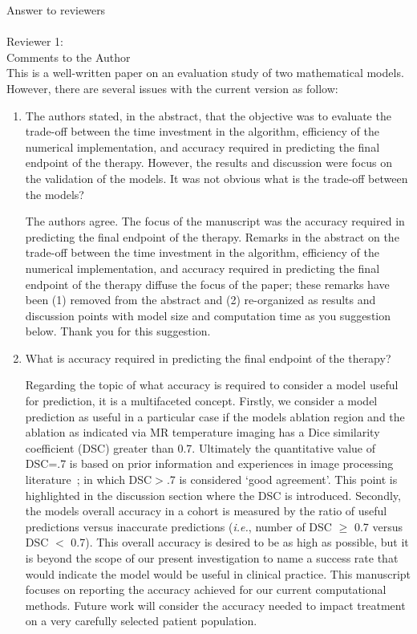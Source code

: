 \documentclass[letterpaper,12pt]{report}
\begin{document}
Answer to reviewers\\
\\
Reviewer 1:\\
Comments to the Author\\
This is a well-written paper on an evaluation study of
two mathematical models. However, there are several issues with the current version as follow:\\

\begin{enumerate}
\item
The authors stated, in the abstract, that the objective
was to evaluate the trade-off between the
time investment in the algorithm, efficiency of the numerical
implementation, and accuracy required in
predicting the final endpoint of the therapy. However,
the results and discussion were focus on the validation
of the models. It was not obvious what is the trade-off
between the models? 

{\color{red}
The authors agree. The focus of the manuscript was
the accuracy required in
predicting the final endpoint of the therapy. 
Remarks in the abstract on the trade-off between the
time investment in the algorithm, efficiency of the numerical
implementation, and accuracy required in
predicting the final endpoint of the therapy diffuse the focus
of the paper; these remarks have been (1) removed from the abstract and (2)
re-organized as results and  discussion points with model size and
computation time as you suggestion below.  Thank you for this suggestion.
}


\item What is accuracy required in predicting the final endpoint of the therapy?
 
{\color{red}

Regarding the topic of what accuracy is required to consider a model useful
for prediction, it is a multifaceted concept. Firstly, we consider a model
prediction as useful in a particular case if the models ablation region and
the ablation as indicated via MR temperature imaging has a Dice similarity
coefficient (DSC) greater than 0.7. Ultimately the quantitative value of
DSC=.7 is based on prior information and experiences in image processing
literature~\cite{yung2010quantitative,Dice1945measures,zou2004three};  
in which DSC$>$.7 is considered `good agreement'. This point is highlighted
in the discussion section where the DSC is introduced.
 Secondly, the models overall accuracy in
a cohort is measured by the ratio of useful predictions versus inaccurate
predictions (\textit{i.e.}, number of DSC $\geq$ 0.7 versus DSC $<$ 0.7).
This overall accuracy is desired to be as high as possible, but it is beyond the
scope of our present investigation to name a success rate that would
indicate the model would be useful in clinical practice. This manuscript
focuses on reporting the accuracy achieved for our current computational
methods. Future work will consider the accuracy needed to impact treatment 
on a very carefully selected patient population.

}
\end{enumerate}
\end{document}
